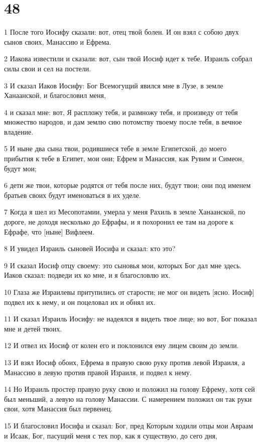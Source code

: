 \chapter{48}

\par 1 После того Иосифу сказали: вот, отец твой болен. И он взял с собою двух сынов своих, Манассию и Ефрема.
\par 2 Иакова известили и сказали: вот, сын твой Иосиф идет к тебе. Израиль собрал силы свои и сел на постели.
\par 3 И сказал Иаков Иосифу: Бог Всемогущий явился мне в Лузе, в земле Ханаанской, и благословил меня,
\par 4 и сказал мне: вот, Я распложу тебя, и размножу тебя, и произведу от тебя множество народов, и дам землю сию потомству твоему после тебя, в вечное владение.
\par 5 И ныне два сына твои, родившиеся тебе в земле Египетской, до моего прибытия к тебе в Египет, мои они; Ефрем и Манассия, как Рувим и Симеон, будут мои;
\par 6 дети же твои, которые родятся от тебя после них, будут твои; они под именем братьев своих будут именоваться в их уделе.
\par 7 Когда я шел из Месопотамии, умерла у меня Рахиль в земле Ханаанской, по дороге, не доходя несколько до Ефрафы, и я похоронил ее там на дороге к Ефрафе, что [ныне] Вифлеем.
\par 8 И увидел Израиль сыновей Иосифа и сказал: кто это?
\par 9 И сказал Иосиф отцу своему: это сыновья мои, которых Бог дал мне здесь. Иаков сказал: подведи их ко мне, и я благословлю их.
\par 10 Глаза же Израилевы притупились от старости; не мог он видеть [ясно. Иосиф] подвел их к нему, и он поцеловал их и обнял их.
\par 11 И сказал Израиль Иосифу: не надеялся я видеть твое лице; но вот, Бог показал мне и детей твоих.
\par 12 И отвел их Иосиф от колен его и поклонился ему лицем своим до земли.
\par 13 И взял Иосиф обоих, Ефрема в правую свою руку против левой Израиля, а Манассию в левую против правой Израиля, и подвел к нему.
\par 14 Но Израиль простер правую руку свою и положил на голову Ефрему, хотя сей был меньший, а левую на голову Манассии. С намерением положил он так руки свои, хотя Манассия был первенец.
\par 15 И благословил Иосифа и сказал: Бог, пред Которым ходили отцы мои Авраам и Исаак, Бог, пасущий меня с тех пор, как я существую, до сего дня,

